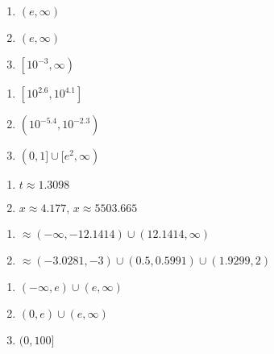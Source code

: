 \begin{multicols}{3}
\begin{enumerate}
\setcounter{enumi}{\value{HW}}

\item $(e, \infty)$
\item $(e, \infty)$
\item $\left[10^{-3}, \infty \right)$

\setcounter{HW}{\value{enumi}}
\end{enumerate}
\end{multicols}

\begin{multicols}{3}
\begin{enumerate}
\setcounter{enumi}{\value{HW}}

\item $\left[10^{2.6}, 10^{4.1}\right]$

\item $\left(10^{-5.4}, 10^{-2.3}\right)$
\item $(0, 1] \cup [e^{2}, \infty)$

\setcounter{HW}{\value{enumi}}
\end{enumerate}
\end{multicols}

\begin{multicols}{2}
\begin{enumerate}
\setcounter{enumi}{\value{HW}}

\item $t \approx 1.3098$
\item $x \approx 4.177, \, x \approx 5503.665$

\setcounter{HW}{\value{enumi}}
\end{enumerate}
\end{multicols}

\begin{multicols}{2}
\begin{enumerate}
\setcounter{enumi}{\value{HW}}

\item $\approx (-\infty, -12.1414) \cup (12.1414, \infty)$
\item $\approx (-3.0281, -3) \cup (0.5, 0.5991) \cup (1.9299, 2)$

\setcounter{HW}{\value{enumi}}
\end{enumerate}
\end{multicols}

\begin{multicols}{3} 
\begin{enumerate}
\setcounter{enumi}{\value{HW}}

\item  $(-\infty, e) \cup (e, \infty)$

\item   $(0,e) \cup (e, \infty)$

\item  $(0, 100]$

\setcounter{HW}{\value{enumi}}
\end{enumerate}
\end{multicols}


